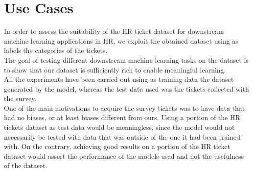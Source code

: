 \chapter{Use Cases}
\label{sec:Use_Cases}

In order to assess the suitability of the HR ticket dataset for downstream machine learning applications in HR, we exploit the obtained dataset using as labels the categories of the tickets. \\
The goal of testing different downstream machine learning tasks on the dataset is to show that our dataset is sufficiently rich to enable meaningful learning. \\
All the experiments have been carried out using as training data the dataset generated by the model, whereas the test data used was the tickets collected with the survey. \\ 
One of the main motivations to acquire the survey tickets was to have data that had no biases, or at least biases different from ours. Using a portion of the HR tickets dataset as test data would be meaningless, since the model would not necessarily be tested with data that was outside of the one it had been trained with. On the contrary, achieving good results on a portion of the HR ticket dataset would assert the performance of the models used and not the usefulness of the dataset.




